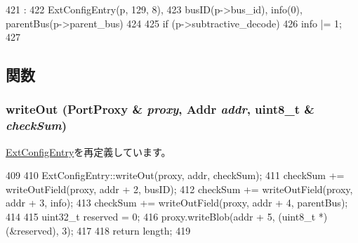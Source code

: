 \begin{DoxyCode}
421                                                   :
422     ExtConfigEntry(p, 129, 8),
423     busID(p->bus_id), info(0), parentBus(p->parent_bus)
424 {
425     if (p->subtractive_decode)
426         info |= 1;
427 }

\end{DoxyCode}


\subsection{関数}
\hypertarget{classX86ISA_1_1IntelMP_1_1BusHierarchy_a5fffc1006b1f28bd779d83ffbe213b4f}{
\subsubsection[{writeOut}]{ writeOut ({\bf PortProxy} \& {\em proxy}, \/  {\bf Addr} {\em addr}, \/  uint8\_\-t \& {\em checkSum})}}
\label{classX86ISA_1_1IntelMP_1_1BusHierarchy_a5fffc1006b1f28bd779d83ffbe213b4f}


\hyperlink{classX86ISA_1_1IntelMP_1_1ExtConfigEntry_a5fffc1006b1f28bd779d83ffbe213b4f}{ExtConfigEntry}を再定義しています。


\begin{DoxyCode}
409 {
410     ExtConfigEntry::writeOut(proxy, addr, checkSum);
411     checkSum += writeOutField(proxy, addr + 2, busID);
412     checkSum += writeOutField(proxy, addr + 3, info);
413     checkSum += writeOutField(proxy, addr + 4, parentBus);
414 
415     uint32_t reserved = 0;
416     proxy.writeBlob(addr + 5, (uint8_t *)(&reserved), 3);
417 
418     return length;
419 }
\end{DoxyCode}


